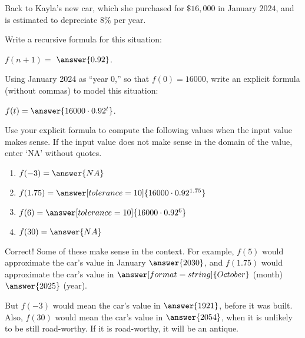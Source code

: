 \documentclass[nooutcomes]{ximera}
\begin{document}
\begin{problem}
Back to Kayla's new car, which she purchased for $\$16,\!000$ in January $2024$, and is estimated to depreciate $8\%$ per year.  

Write a recursive formula for this situation:  

\begin{prompt}
$f(n+1) =$ 
\wordChoice{\choice{$+$}\choice{$-$}\choice[correct]{$\times$}\choice{$\div$}\choice{$\wedge$}}$\answer{0.92}$.
\end{prompt}
\begin{problem}
Using January 2024 as ``year 0,'' so that $f(0)=16000$,  write an explicit formula (without commas) to model this situation: 
\begin{prompt}
$f(t) = \answer{16000\cdot 0.92^t}$.
\end{prompt}

\begin{problem}
Use your explicit formula to compute the following values when the input value makes sense.  If the input value does not make sense in the domain of the value, enter `NA' without quotes.
\begin{enumerate}
\item $f(-3) = \answer{NA}$
\item $f(1.75) = \answer[tolerance=10]{16000\cdot 0.92^{1.75}}$
\item $f(6) = \answer[tolerance=10]{16000\cdot 0.92^6}$
\item $f(30) = \answer{NA}$
\end{enumerate}
\begin{problem}
Correct!  Some of these make sense in the context.  For example, $f(5)$ would approximate the car's value in January $\answer{2030}$, and $f(1.75)$ would approximate the car's value in $\answer[format=string]{October}$ (month) $\answer{2025}$ (year).  

But $f(-3)$ would mean the car's value in $\answer{1921}$, before it was built.  Also, $f(30)$ would mean the car's value in $\answer{2054}$, when it is unlikely to be still road-worthy.  If it is road-worthy, it will be an antique.    

\end{problem}

\end{problem}
\end{problem}
\end{problem}
\end{document}
